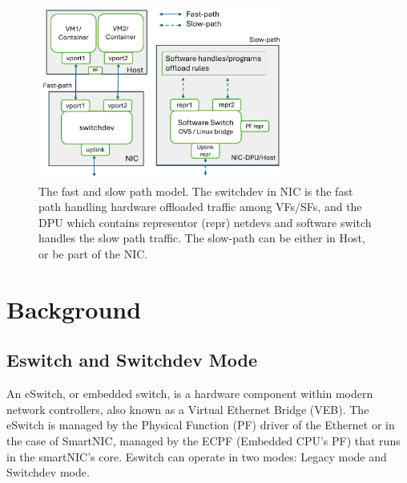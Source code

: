 \documentclass[letterpaper]{article}
\begin{document}
\begin{figure}[t!]
\includegraphics[width=3.2in]{arch.pdf}
\caption{The fast and slow path model. The switchdev in NIC is the fast path handling
hardware offloaded traffic among VFs/SFs, and the DPU which contains representor (repr) netdevs and software switch handles the slow path traffic. The slow-path can be
either in Host, or be part of the NIC.}
\label{fig:arch}
\end{figure}

\section{Background}
\subsection{Eswitch and Switchdev Mode}
An eSwitch, or embedded switch, is a hardware component within modern network
controllers, also known as a Virtual Ethernet Bridge (VEB). The eSwitch is managed
by the Physical Function (PF) driver of the Ethernet or in the case of SmartNIC,
managed by the ECPF (Embedded
CPU's PF) that runs in the smartNIC's core. Eswitch can operate in two modes:
Legacy mode and Switchdev mode.
\end{document}
